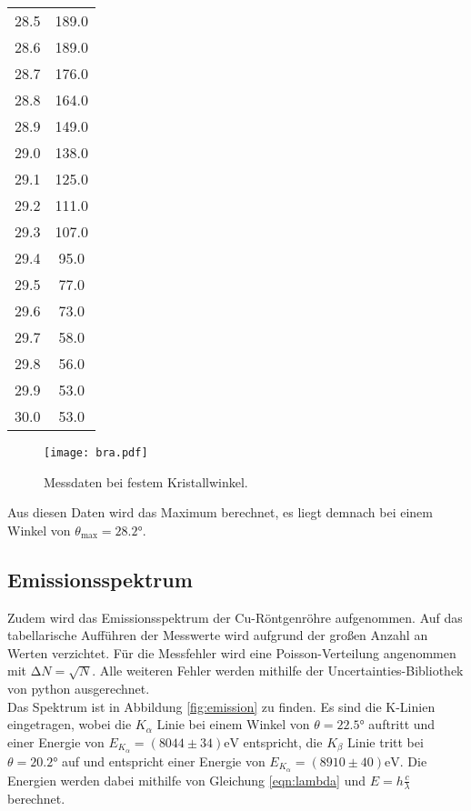 \begin{table}
\begin{tabular}{c c}
      28.5	& 189.0 \\
      28.6	& 189.0 \\
      28.7	& 176.0 \\
      28.8	& 164.0 \\
      28.9	& 149.0 \\
      29.0	& 138.0 \\
      29.1	& 125.0 \\
      29.2	& 111.0 \\
      29.3	& 107.0 \\
      29.4	& 95.0\\
      29.5	& 77.0\\
      29.6	& 73.0\\
      29.7	& 58.0\\
      29.8	& 56.0\\
      29.9	& 53.0\\
      30.0	& 53.0\\
      \bottomrule
    \end{tabular}
  \end{table}

  \begin{figure}
    \centering
    \texttt{[image: bra.pdf]}
    \caption{Messdaten bei festem Kristallwinkel.}
    \label{fig:bra}
  \end{figure}

  \FloatBarrier
  \noindent Aus diesen Daten wird das Maximum berechnet, es liegt demnach bei einem Winkel von $\theta_{\text{max}} = 28.2°$. %

\subsection{Emissionsspektrum}
  Zudem wird das Emissionsspektrum der Cu-Röntgenröhre aufgenommen. Auf das tabellarische Aufführen der Messwerte wird aufgrund 
  der großen Anzahl an Werten verzichtet. Für die Messfehler wird eine Poisson-Verteilung angenommen mit $\increment N = \sqrt{N}$. Alle weiteren Fehler werden mithilfe
  der Uncertainties-Bibliothek von python ausgerechnet.\\
  Das Spektrum ist in Abbildung \ref{fig:emission} zu finden. Es sind die K-Linien eingetragen, wobei die 
  $K_{\alpha}$ Linie bei einem Winkel von $\theta = 22.5 °$ auftritt und einer Energie von $E_{K_{\alpha}} = (8044 \pm 34) \text{eV}$ entspricht,
  die $K_{\beta}$ Linie tritt bei $\theta = 20.2 °$ auf und entspricht einer Energie von $E_{K_{\alpha}} = (8910 \pm 40) \text{eV}$. Die Energien werden dabei mithilfe
  von Gleichung \eqref{eqn:lambda}
  und $E = h \frac{c}{\lambda}$ berechnet.

